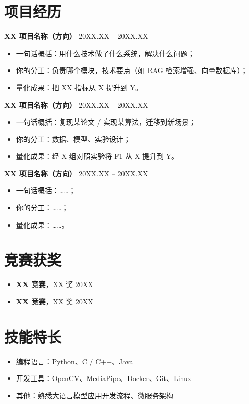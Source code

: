 \documentclass[12pt]{ctexart}
\newlength{\iconwidth}
\begin{document}
\section[项目经历]{\makebox[\iconwidth][c]{\faChalkboardTeacher}\quad 项目经历}

{\large \textbf{XX 项目名称（方向）}} \hfill 20XX.XX -- 20XX.XX
\begin{itemize}
  \item 一句话概括：用什么技术做了什么系统，解决什么问题；
  \item 你的分工：负责哪个模块，技术要点（如 RAG 检索增强、向量数据库）；
  \item 量化成果：把 XX 指标从 X 提升到 Y。
\end{itemize}

{\large \textbf{XX 项目名称（方向）}} \hfill 20XX.XX -- 20XX.XX
\begin{itemize}
  \item 一句话概括：复现某论文 / 实现某算法，迁移到新场景；
  \item 你的分工：数据、模型、实验设计；
  \item 量化成果：经 X 组对照实验将 F1 从 X 提升到 Y。
\end{itemize}

{\large \textbf{XX 项目名称（方向）}} \hfill 20XX.XX -- 20XX.XX
\begin{itemize}
  \item 一句话概括：……；
  \item 你的分工：……；
  \item 量化成果：……。
\end{itemize}

\section[竞赛获奖]{\makebox[\iconwidth][c]{\faTrophy}\quad 竞赛获奖}
\begin{itemize}
  \item \textbf{XX 竞赛}，XX 奖 \hfill 20XX
  \item \textbf{XX 竞赛}，XX 奖 \hfill 20XX
\end{itemize}

\section[技能特长]{\makebox[\iconwidth][c]{\faWrench}\quad 技能特长}
\begin{itemize}
  \item 编程语言：Python、C / C++、Java
  \item 开发工具：OpenCV、MediaPipe、Docker、Git、Linux
  \item 其他：熟悉大语言模型应用开发流程、微服务架构
\end{itemize}
\end{document}
